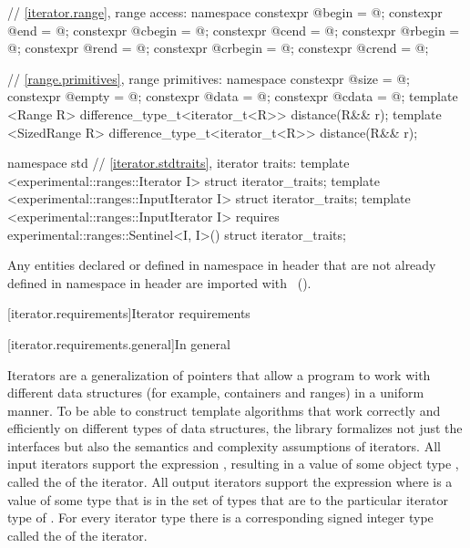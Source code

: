\begin{codeblock}
{{{{  // \ref{iterator.range}, range access:
  namespace {
    constexpr @\unspec@ begin = @\unspec@;
    constexpr @\unspec@ end = @\unspec@;
    constexpr @\unspec@ cbegin = @\unspec@;
    constexpr @\unspec@ cend = @\unspec@;
    constexpr @\unspec@ rbegin = @\unspec@;
    constexpr @\unspec@ rend = @\unspec@;
    constexpr @\unspec@ crbegin = @\unspec@;
    constexpr @\unspec@ crend = @\unspec@;
  }

  // \ref{range.primitives}, range primitives:
  namespace {
    constexpr @\unspec@ size = @\unspec@;
    constexpr @\unspec@ empty = @\unspec@;
    constexpr @\unspec@ data = @\unspec@;
    constexpr @\unspec@ cdata = @\unspec@;
  }
  template <Range R>
  difference_type_t<iterator_t<R>> distance(R&& r);
  template <SizedRange R>
  difference_type_t<iterator_t<R>> distance(R&& r);
}}}}

namespace std {
  // \ref{iterator.stdtraits}, iterator traits:
  template <experimental::ranges::Iterator I>
    struct iterator_traits;
  template <experimental::ranges::InputIterator I>
    struct iterator_traits;
  template <experimental::ranges::InputIterator I>
      requires experimental::ranges::Sentinel<I, I>()
    struct iterator_traits;
}
\end{codeblock}

\pnum
Any entities declared or defined in namespace  in header 
that are not already defined in namespace  in header
 are imported with
~().

[iterator.requirements]{Iterator requirements}

[iterator.requirements.general]{In general}

\pnum
{}%
Iterators are a generalization of pointers that allow a \Cpp program to work with different data structures
(for example, containers and ranges) in a uniform manner.
To be able to construct template algorithms that work correctly and
efficiently on different types of data structures, the library formalizes not just the interfaces but also the
semantics and complexity assumptions of iterators.
All input iterators
support the expression
,
resulting in a value of some object type
,
called the
of the iterator.
All output iterators support the expression
where
is a value of some type that is in the set of types that are
to the particular iterator type of
.
For every iterator type
there is a corresponding signed integer type called the
of the iterator.

